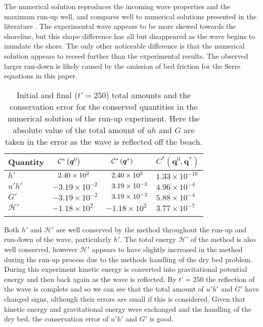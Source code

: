 \documentclass[AMA,STIX1COL]{WileyNJD-v2}
\newcommand\T{\rule{0pt}{5ex }}       %
\newcommand\B{\rule[-4ex]{0pt}{4ex }} %
\newcommand{\vecn}[1]{\boldsymbol{#1}}
\begin{document}
The numerical solution reproduces the incoming wave properties and the maximum run-up well, and compares well to numerical solutions presented in the literature \cite{Li-2014-169,Filippini-etal-2016-381}. The experimental wave appears to be more skewed towards the shoreline, but this shape difference has all but disappeared as the wave begins to inundate the shore. The only other noticeable difference is that the numerical solution appears to receed further than the experimental results. The observed larger run-down is likely caused by the omission of bed friction for the Serre equations in this paper.


\begin{table}
	\centering
	\begin{tabular}{l l l l}
		\hline
		Quantity& $\hphantom{-}\mathcal{C}^*\left(\vecn{q}^0\right)$ & $\hphantom{-}\mathcal{C}^*\left(\vecn{q}^*\right)$ & ${C}^*\left(\vecn{q}^0,\vecn{q}^*\right)$  \T\B\\
		\hline 
		$h'$ & $\hphantom{-}2.40\times 10^2$ & $\hphantom{-}2.40 \times 10^2$ & $1.33\times 10^{-10}$ \T \\
		$u'h'$ & $-3.19 \times 10 ^{-2}$ & $\hphantom{-}3.19 \times 10 ^{-2}$ & $4.96\times 10^{-4}$\\
		$G'$ & $-3.19 \times 10 ^{-2}$ & $\hphantom{-}3.19 \times 10 ^{-2}$ & $5.88\times 10^{-4}$\\
		$\mathcal{H}'$ & $-1.18 \times 10^{2}$ & $-1.18 \times 10^{2}$ & $3.77 \times 10^{-7}$ \B\\
		\hline \\
	\end{tabular}
	\caption{Initial and final ($t'=250$) total amounts and the conservation error for the conserved quantities in the numerical solution of the run-up experiment. Here the absolute value of the total amount of $uh$ and $G$ are taken in the error as the wave is reflected off the beach.}
	\label{tab:ConservationSynFEVM}
\end{table}

Both $h'$ and $\mathcal{H}'$ are well conserved by the method throughout the run-up and run-down of the wave, particularly $h'$. The total energy $\mathcal{H}'$ of the method is also well conserved, however $\mathcal{H}'$ appears to have slightly increased in the method during the run-up process due to the methods handling of the dry bed problem. During this experiment kinetic energy is converted into gravitational potential energy and then back again as the wave is reflected. By $t' = 250$ the reflection of the wave is complete and so we can see that the total amount of $u'h'$ and $G'$ have changed signs, although their errors are small if this is considered. Given that kinetic energy and gravitational energy were exchanged and the handling of the dry bed, the conservation error of $u'h'$ and $G'$ is good. 
\end{document}
